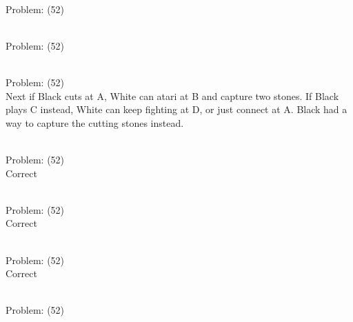 \documentclass[11pt]{article}
\begin{document}
\begin{minipage}[t]{0.5\textwidth}
  {\centering
  
\\
Problem: (52)\\
  }
\end{minipage}
\begin{minipage}[t]{0.5\textwidth}
  {\centering
  
\\
Problem: (52)\\
  }
\end{minipage}
\begin{minipage}[t]{0.5\textwidth}
  {\centering
  
\\
Problem: (52)\\
Next if Black cuts at A, White can atari at B and capture two stones. If Black plays C instead, White can keep fighting at D, or just connect at A. Black had a way to capture the cutting stones instead.\\
  }
\end{minipage}
\begin{minipage}[t]{0.5\textwidth}
  {\centering
  
\\
Problem: (52)\\
Correct\\
  }
\end{minipage}
\begin{minipage}[t]{0.5\textwidth}
  {\centering
  
\\
Problem: (52)\\
Correct\\
  }
\end{minipage}
\begin{minipage}[t]{0.5\textwidth}
  {\centering
  
\\
Problem: (52)\\
Correct\\
  }
\end{minipage}
\begin{minipage}[t]{0.5\textwidth}
  {\centering
  
\\
Problem: (52)\\
  }
\end{minipage}
\end{document}
